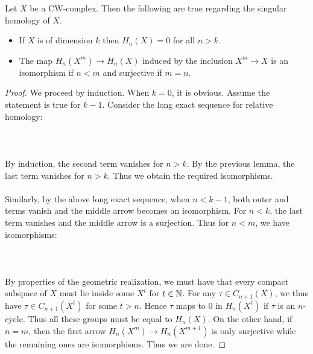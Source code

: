 \documentclass[a4paper]{article}
\begin{document}
\begin{lmm}{}{} Let $X$ be a CW-complex. Then the following are true regarding the singular homology of $X$. 
\begin{itemize}
\item If $X$ is of dimension $k$ then $H_n(X)=0$ for all $n>k$. 
\item The map $H_n(X^m)\to H_n(X)$ induced by the inclusion $X^m\to X$ is an isomorphism if $n<m$ and surjective if $m=n$. 
\end{itemize} \tcbline
\begin{proof}
We proceed by induction. When $k=0$, it is obvious. Assume the statement is true for $k-1$. Consider the long exact sequence for relative homology: \\~\\
\\~\\
By induction, the second term vanishes for $n>k$. By the previous lemma, the last term vanishes for $n>k$. Thus we obtain the required isomorphisms. \\~\\

Similarly, by the above long exact sequence, when $n<k-1$, both outer and terms vanish and the middle arrow becomes an isomorphism. For $n<k$, the last term vanishes and the middle arrow is a surjection. Thus for $n<m$, we have isomorphisms: \\~\\
\\~\\
By properties of the geometric realization, we must have that every compact subspace of $X$ must lie inside some $X^t$ for $t\in\mathbb{N}$. For any $\tau\in C_{n+1}(X)$, we thus have $\tau\in C_{n+1}(X^t)$ for some $t>n$. Hence $\tau$ maps to $0$ in $H_n(X^t)$ if $\tau$ is an $n$-cycle. Thus all these groups must be equal to $H_n(X)$. On the other hand, if $n=m$, then the first arrow $H_n(X^m)\to H_n(X^{m+1})$ is only surjective while the remaining ones are isomorphisms. Thus we are done. 
\end{proof}
\end{lmm}
\end{document}
